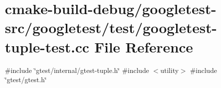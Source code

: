 \hypertarget{googletest-tuple-test_8cc}{}\section{cmake-\/build-\/debug/googletest-\/src/googletest/test/googletest-\/tuple-\/test.cc File Reference}
\label{googletest-tuple-test_8cc}
{\ttfamily \#include \char`\"{}gtest/internal/gtest-\/tuple.\+h\char`\"{}}\newline
{\ttfamily \#include $<$utility$>$}\newline
{\ttfamily \#include \char`\"{}gtest/gtest.\+h\char`\"{}}\newline
